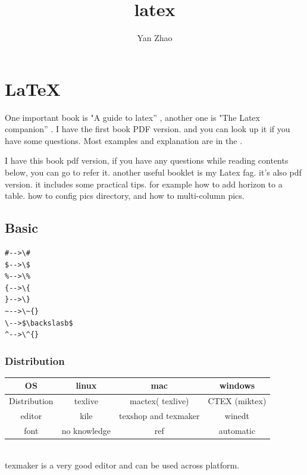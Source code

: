 \documentclass[a4paper,12pt,twoside]{book}
\begin{document}

\title{latex}
\author{Yan Zhao}
\date{}\maketitle

\else
\chapter{LaTeX}
\fi


	One important book is "A guide to latex'' \cite{Guide}, another one is "The Latex companion'' \cite{Companion}. I have the first book PDF version. and you can look up it if you have some questions. Most examples and explanation are in the \cite{Guide}.

	I have this book pdf version, if you have any questions while reading contents below, you can go to refer it. another useful booklet is my Latex fag. it's also pdf version. it includes some practical tips. for example how to add horizon to a table. how to config pics directory, and how to multi-column pics.

	
\section{Basic}

\begin{verbatim}
#-->\#
$-->\$
%-->\%
{-->\{
}-->\}
~-->\~{}
\-->$\backslasb$
^-->\^{}
\end{verbatim}

	\subsection{Distribution}
		\begin{tabular}{|c|c|c|c|}
		\hline OS & linux & mac & windows \\
		\hline Distribution & texlive & mactex( texlive) & CTEX (miktex) \\
		\hline editor & kile & texshop and texmaker & winedt \\
		\hline font & no knowledge & ref\cite{MacFont} & automatic \\
		\hline
		\end{tabular} \\
		texmaker is a very good editor and can be used across platform. \\
		
\end{document}
